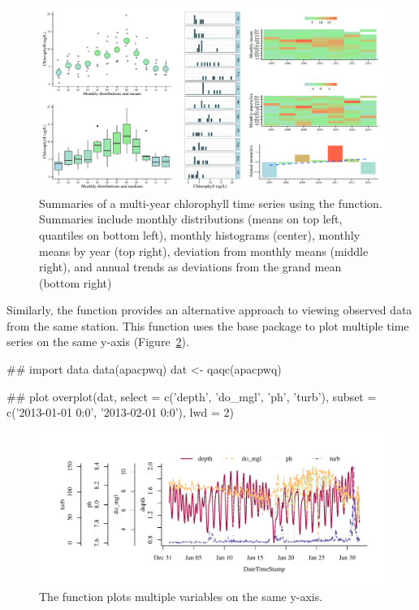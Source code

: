 \begin{figure}[!h]

{\centering \includegraphics[width=\textwidth]{summary_ex-1} 

}

\caption[Summaries of a multi-year chlorophyll time series using the  function]{Summaries of a multi-year chlorophyll time series using the  function.  Summaries include monthly distributions (means on top left, quantiles on bottom left), monthly histograms (center), monthly means by year (top right), deviation from monthly means (middle right), and annual trends as deviations from the grand mean (bottom right)}\label{fig:summary_ex}
\end{figure}

Similarly, the  function provides an alternative approach to viewing observed data from the same station.  This function uses the base  package to plot multiple time series on the same y-axis (Figure~\ref{fig:overplot}).

\begin{example}
## import data
data(apacpwq)
dat <- qaqc(apacpwq)

## plot
overplot(dat, select = c('depth', 'do_mgl', 'ph', 'turb'),
  subset = c('2013-01-01 0:0', '2013-02-01 0:0'), lwd = 2)
\end{example}

\begin{figure}[!h]

{\centering \includegraphics[width=\textwidth]{overplot-1} 

}

\caption[The  function plots multiple variables on the same y-axis]{The  function plots multiple variables on the same y-axis.}\label{fig:overplot}
\end{figure}

